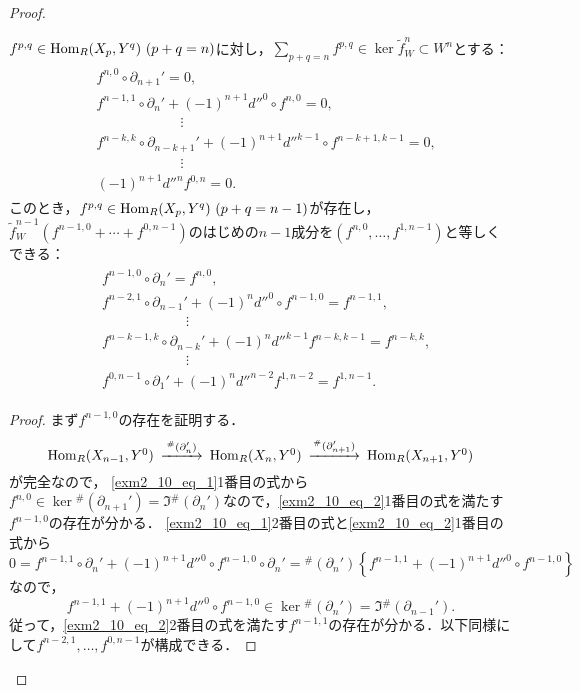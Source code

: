 \begin{proof}
  \begin{lem}\label{lem1.1}
    $f^{p, q} \in \operatorname{Hom}_R(X_p, Y^q)~(p+q=n)$に対し，$\sum_{p+q=n} f^{p, q} \in \ker \tilde{f}_W^n \subset W^n$とする：
    \begin{align}
      \begin{split}
        & f^{n, 0} \circ \partial_{n+1}' = 0, \\
        & f^{n-1, 1} \circ \partial_n' + (-1)^{n+1} d''^0 \circ f^{n, 0} = 0, \\
        & \qquad\qquad\qquad \vdots \\
        & f^{{n-k}, k} \circ \partial_{n-k+1}' + (-1)^{n+1} d''^{k-1} \circ f^{n-k+1, k-1} = 0, \\
        & \qquad\qquad\qquad \vdots \\
        & (-1)^{n+1} d''^n f^{0, n} = 0.
      \end{split}
      \label{exm2_10_eq_1}
    \end{align}
    このとき，$f^{p, q} \in \operatorname{Hom}_R(X_p, Y^q)~(p+q=n-1)$が存在し，$\tilde{f}_W^{n-1}(f^{n-1, 0} + \cdots + f^{0, n-1})$のはじめの$n-1$成分を$(f^{n, 0}, \ldots, f^{1, n-1})$と等しくできる：
    \begin{align}
      \begin{split}
        & f^{n-1, 0} \circ \partial_{n}' = f^{n, 0}, \\
        & f^{n-2, 1} \circ \partial_{n-1}' + (-1)^{n}d''^0 \circ f^{n-1, 0} = f^{n-1, 1}, \\
        & \qquad\qquad\qquad \vdots \\
        & f^{n-k-1, k} \circ \partial_{n-k}' + (-1)^{n} d''^{k-1} f^{n-k, k-1} = f^{n-k, k}, \\
        & \qquad\qquad\qquad \vdots \\
        & f^{0, n-1} \circ \partial_1' + (-1)^{n} d''^{n-2} f^{1, n-2} = f^{1, n-1} .
      \end{split}
      \label{exm2_10_eq_2}
    \end{align}
  \end{lem}
  \begin{proof}
    まず$f^{n-1, 0}$の存在を証明する．
    \[
    \begin{CD}
      \Hom_R(X_{n-1}, Y^0) @>{^\#(\partial_n')}>> \Hom_R(X_n, Y^0) @>{^\#(\partial_{n+1}')}>> \Hom_R(X_{n+1}, Y^0)
    \end{CD}
    \]
    が完全なので，
    \eqref{exm2_10_eq_1}1番目の式から$f^{n, 0} \in \ker {}^\#(\partial_{n+1}') = \Im {}^\#(\partial_n')$なので，\eqref{exm2_10_eq_2}1番目の式を満たす$f^{n-1, 0}$の存在が分かる．
    \eqref{exm2_10_eq_1}2番目の式と\eqref{exm2_10_eq_2}1番目の式から
    \[ 0 = f^{n-1, 1} \circ \partial_n' + (-1)^{n+1} d''^0 \circ f^{n-1, 0} \circ \partial_{n}' = {}^\#(\partial_n') \left\{ f^{n-1, 1} + (-1)^{n+1} d''^0 \circ f^{n-1, 0} \right\} \]
    なので，
    \[ f^{n-1, 1} + (-1)^{n+1} d''^0 \circ f^{n-1, 0} \in \ker {}^\#(\partial_n') = \Im {}^\#(\partial_{n-1}').  \]
    従って，\eqref{exm2_10_eq_2}2番目の式を満たす$f^{n-1, 1}$の存在が分かる．以下同様にして$f^{n-2, 1}, \ldots, f^{0, n-1}$が構成できる．
  \end{proof}


\end{proof}
